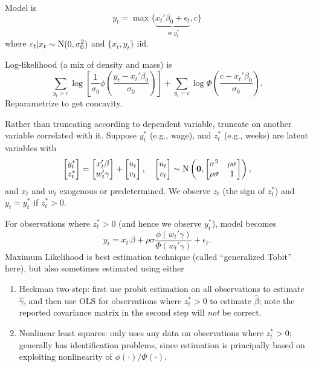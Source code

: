 \documentclass[8pt,letterpaper, landscape]{extarticle} %
\newcommand{\mzero}{\ensuremath{\mathbf{0}}}
\begin{document}
\begin{multicols}{3}
\begin{description}
Model is
\[ y_t = \max \{ \underbrace{x_{t}' \beta_0 + \epsilon_t}_{\equiv y_{t}^*} , c  \} \]
where $ \varepsilon_t | x_t \sim \operatorname{N} (0, \sigma_{0}^2) $ and $ \{x_t , y_t \} $ iid.

Log-likelihood (a mix of density and mass) is
\[ \sum_{y_t > c} \log \left[ \frac{1}{\sigma_0} \phi \left( \frac{y_t - x_{t}' \beta_0}{\sigma_0}  \right)  \right] + \sum_{y_t = c} \log \Phi \left( \frac{c - x_{t}' \beta_0}{\sigma_0}  \right) . \]
Reparametrize to get concavity.

 Rather than truncating according to dependent variable, truncate on another variable correlated with it. Suppose $ y_{t}^* $ (e.g., wage), and $ z_{t}^* $ (e.g., weeks) are latent variables with
\[ \begin{bmatrix} y_{t}^* \\ z_{t}^* \end{bmatrix}
=
\begin{bmatrix} x_{t}' \beta \\ w_{t}' \gamma \end{bmatrix}
+
\begin{bmatrix} u_t \\ v_t  \end{bmatrix}, \quad
\begin{bmatrix} u_t \\ v_t  \end{bmatrix} \sim \n \left( \mzero ,
\begin{bmatrix} \sigma^2 & \rho \sigma \\  \rho \sigma & 1 \end{bmatrix} \right),
 \]
and $ x_t $ and $ w_t $ exogenous or predetermined. We observe $ z_t $ (the sign of $ z_t^* $) and $ y_t = y_{t}^* $ if $ z_{t}^* > 0 $.

For observations where $ z_{t}^* > 0 $ (and hence we observe $ y_{t}^*  $), model becomes
\[ y_t = x_{t'}\beta + \rho \sigma \frac{\phi (w_{t}' \gamma)}{\Phi (w_{t}' \gamma)} + \epsilon_t . \]
Maximum Likelihood is best estimation technique (called ``generalized Tobit'' here), but also sometimes estimated using either
\begin{enumerate}
\item Heckman two-step: first use probit estimation on all observations to estimate $ \hat{\gamma} $, and then use OLS for observations where $ z_{t}^* > 0 $ to estimate $ \hat{\beta} $; note the reported covariance matrix in the second step will \textit{not} be correct.
\item Nonlinear least squares: only uses any data on observations where $ z_{t}^* > 0 $; generally has identification problems, since estimation is principally based on exploiting nonlinearity of $ \phi (\cdot) / \Phi (\cdot) $.
\end{enumerate}


\end{description}
\end{multicols}
\end{document}
